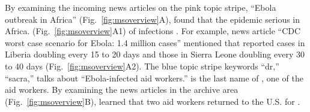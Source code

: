 By examining the incoming news articles on the pink topic stripe, ``Ebola outbreak in Africa'' (Fig.~\ref{fig:msoverview}A),  found that the epidemic  serious in Africa.
 (Fig.~\ref{fig:msoverview}A1)   of infections .
For example,  news article  ``CDC worst case scenario for Ebola: 1.4 million cases'' mentioned that reported cases in Liberia  doubling every 15 to 20 days and those in Sierra Leone  doubling every 30 to 40 days (Fig.~\ref{fig:msoverview}A2).
The blue topic stripe  keywords ``dr,'' ``sacra,''  talks about ``Ebola-infected aid workers.''
 is the last name of , one of the aid workers.
By examining the news articles in the archive area (Fig.~\ref{fig:msoverview}B),  learned that two aid workers returned to the U.S. for .
